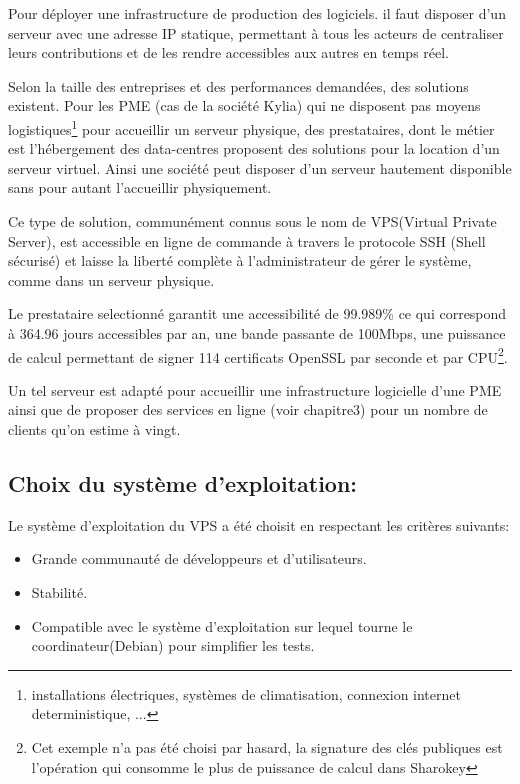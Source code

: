 \documentclass{themeensg}
\begin{document}
Pour déployer une infrastructure de production des logiciels. il faut disposer d'un serveur avec une adresse IP statique, permettant à tous les acteurs de centraliser leurs contributions et de les rendre accessibles aux autres en temps réel.

Selon la taille des entreprises et des performances demandées, des solutions existent. Pour les PME (cas de la société Kylia) qui ne disposent pas moyens logistiques\footnote{installations électriques, systèmes de climatisation, connexion internet deterministique, ...} pour accueillir un serveur physique, des prestataires, dont le métier est l'hébergement des data-centres proposent des solutions pour la location d'un serveur virtuel. Ainsi une société peut disposer d'un serveur hautement disponible sans pour autant l'accueillir physiquement.

Ce type de solution, communément connus sous le nom de VPS(Virtual Private Server), est accessible en ligne de commande à travers le protocole SSH (Shell sécurisé) et laisse la liberté complète à l'administrateur de gérer le système, comme dans un serveur physique.

Le prestataire selectionné garantit une accessibilité de 99.989\% ce qui correspond à 364.96 jours accessibles par an, une bande passante de 100Mbps, une puissance de calcul permettant de signer 114 certificats OpenSSL par seconde et par CPU\footnote{Cet exemple n'a pas été choisi par hasard, la signature des clés publiques est l'opération qui consomme le plus de puissance de calcul dans Sharokey}.

Un tel serveur est adapté pour accueillir une infrastructure logicielle d'une PME ainsi que de proposer des services en ligne (voir chapitre3) pour un nombre de clients qu'on estime à vingt.

\subsection{Choix du système d'exploitation:}

Le système d'exploitation du VPS a été choisit en respectant les critères suivants:
\begin{itemize}
\item Grande communauté de développeurs et d'utilisateurs.
\item Stabilité.
\item Compatible avec le système d'exploitation sur lequel tourne le coordinateur(Debian) pour simplifier les tests.
\end{itemize}
\end{document}
